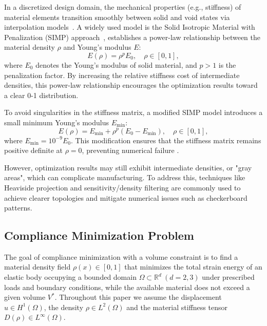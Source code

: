 \documentclass[mathpazo]{cicp}
\begin{document}
In a discretized design domain, the mechanical properties (e.g., stiffness) of material elements transition smoothly between solid and void states via interpolation models~\cite{bendsoe1989optimal}. A widely used model is the Solid Isotropic Material with Penalization (SIMP) approach~\cite{zhou1991coc}, establishes a power-law relationship between the material density $\rho$ and Young's modulus $E$:
\begin{equation*}
	E(\rho) = \rho^p E_0,\quad \rho \in [0,1],
\end{equation*}
where $E_0$ denotes the Young's modulus of solid material, and $p>1$ is the penalization factor. By increasing the relative stiffness cost of intermediate densities, this power-law relationship encourages the optimization results toward a clear 0-1 distribution.

To avoid singularities in the stiffness matrix, a modified SIMP model introduces a small minimum Young's modulus $E_{\min}$:
\begin{equation*}
	E(\rho) = E_{\min} + \rho^p(E_0 - E_{\min}),\quad \rho \in [0,1],
\end{equation*}
where $E_{\min} = 10^{-9} E_0$. This modification ensures that the stiffness matrix remains positive definite at $\rho = 0$, preventing numerical failure \cite{sigmund2007morphology}.

However, optimization results may still exhibit intermediate densities, or "gray areas", which can complicate manufacturing. To address this, techniques like Heaviside projection and sensitivity/density filtering are commonly used to achieve clearer topologies and mitigate numerical issues such as checkerboard patterns.

\subsection{Compliance Minimization Problem}
The goal of compliance minimization with a volume constraint is to find a material density field $\rho(x)\in[0,1]$ that minimizes the total strain energy of an elastic body occupying a bounded domain $\Omega\subset\mathbb{R}^d~(d=2,3)$ under prescribed loads and boundary conditions, while the available material does not exceed a given volume $V^*$. Throughout this paper we assume the displacement $u\in{H}^1(\Omega)$, the density $\rho\in{L}^2(\Omega)$ and the material stiffness tensor $D(\rho)\in{L}^{\infty}(\Omega)$.
\end{document}
